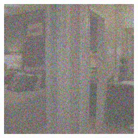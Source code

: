 \begin{figure}[H]
\begin{minipage}[b]{0.3\linewidth}
  \end{minipage}
\hspace{0.1cm}
  \begin{minipage}[b]{0.3\linewidth}
    \includegraphics[width=\linewidth]{Picture/progress/random/x_0200.png}
  \end{minipage}
\end{figure}

